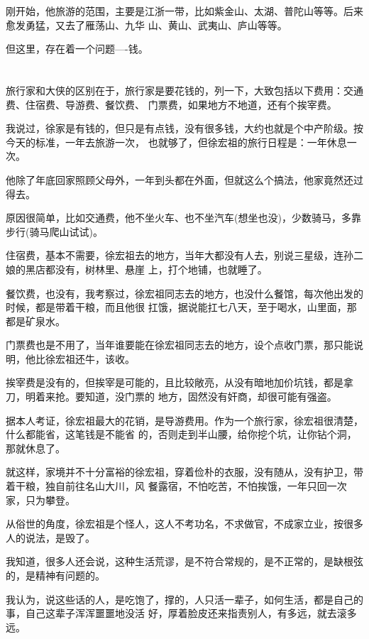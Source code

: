 \documentclass[11pt,a4paper,onecolumn]{article}
\begin{document}
刚开始，他旅游的范围，主要是江浙一带，比如紫金山、太湖、普陀山等等。后来愈发勇猛，又去了雁荡山、九华
山、黄山、武夷山、庐山等等。

但这里，存在着一个问题----钱。

\section[\thesection]{}

旅行家和大侠的区别在于，旅行家是要花钱的，列一下，大致包括以下费用：交通费、住宿费、导游费、餐饮费、
门票费，如果地方不地道，还有个挨宰费。

我说过，徐家是有钱的，但只是有点钱，没有很多钱，大约也就是个中产阶级。按今天的标准，一年去旅游一次，
也就够了，但徐宏祖的旅行日程是：一年休息一次。

他除了年底回家照顾父母外，一年到头都在外面，但就这么个搞法，他家竟然还过得去。

原因很简单，比如交通费，他不坐火车、也不坐汽车(想坐也没)，少数骑马，多靠步行(骑马爬山试试)。

住宿费，基本不需要，徐宏祖去的地方，当年大都没有人去，别说三星级，连孙二娘的黑店都没有，树林里、悬崖
上，打个地铺，也就睡了。

餐饮费，也没有，我考察过，徐宏祖同志去的地方，也没什么餐馆，每次他出发的时候，都是带着干粮，而且他很
扛饿，据说能扛七八天，至于喝水，山里面，那都是矿泉水。

门票费也是不用了，当年谁要能在徐宏祖同志去的地方，设个点收门票，那只能说明，他比徐宏祖还牛，该收。

挨宰费是没有的，但挨宰是可能的，且比较敞亮，从没有暗地加价坑钱，都是拿刀，明着来抢。要知道，没门票的
地方，固然没有奸商，却很可能有强盗。

据本人考证，徐宏祖最大的花销，是导游费用。作为一个旅行家，徐宏祖很清楚，什么都能省，这笔钱是不能省
的，否则走到半山腰，给你挖个坑，让你钻个洞，那就休息了。

就这样，家境并不十分富裕的徐宏祖，穿着俭朴的衣服，没有随从，没有护卫，带着干粮，独自前往名山大川，风
餐露宿，不怕吃苦，不怕挨饿，一年只回一次家，只为攀登。

从俗世的角度，徐宏祖是个怪人，这人不考功名，不求做官，不成家立业，按很多人的说法，是毁了。

我知道，很多人还会说，这种生活荒谬，是不符合常规的，是不正常的，是缺根弦的，是精神有问题的。

我认为，说这些话的人，是吃饱了，撑的，人只活一辈子，如何生活，都是自己的事，自己这辈子浑浑噩噩地没活
好，厚着脸皮还来指责别人，有多远，就去滚多远。
\end{document}
